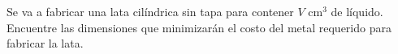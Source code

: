 \item Se va a fabricar una lata cilíndrica sin tapa para contener $V$ cm$^3$ de líquido. Encuentre las dimensiones que minimizarán el costo del metal requerido para fabricar la lata.
